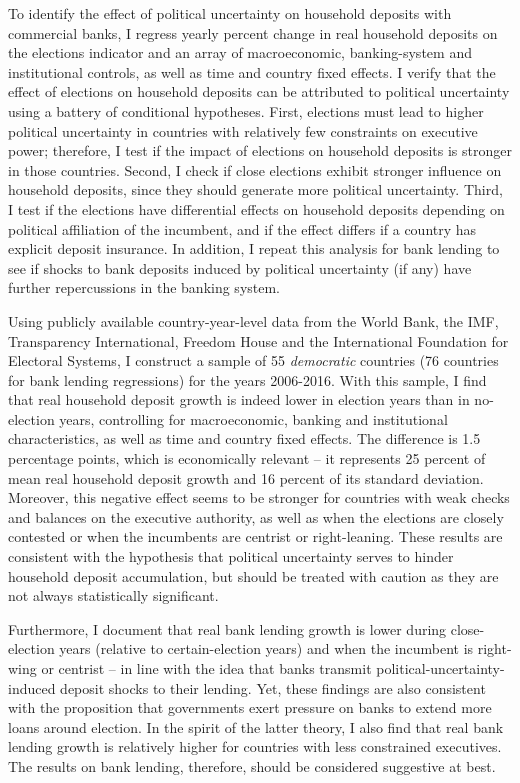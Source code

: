 \documentclass[12pt,a4paper]{article}
\begin{document}
To identify the effect of political uncertainty on household deposits with commercial banks, I regress yearly percent change in real household deposits on the elections indicator and an array of macroeconomic, banking-system and institutional controls, as well as time and country fixed effects. I verify that the effect of elections on household deposits can be attributed to political uncertainty using a battery of conditional hypotheses. First, elections must lead to higher political uncertainty in countries with relatively few constraints on executive power; therefore, I test if the impact of elections on household deposits is stronger in those countries. Second, I check if close elections exhibit stronger influence on household deposits, since they should generate more political uncertainty. Third, I test if the elections have differential effects on household deposits depending on political affiliation of the incumbent, and if the effect differs if a country has explicit deposit insurance. In addition, I repeat this analysis for bank lending to see if shocks to bank deposits induced by political uncertainty (if any) have further repercussions in the banking system.

Using publicly available country-year-level data from the World Bank, the IMF, Transparency International, Freedom House and the International Foundation for Electoral Systems, I construct a sample of 55 \emph{democratic} countries (76 countries for bank lending regressions) for the years 2006-2016. With this sample, I find that real household deposit growth is indeed lower in election years than in no-election years, controlling for macroeconomic, banking and institutional characteristics, as well as time and country fixed effects. The difference is 1.5 percentage points, which is economically relevant -- it represents 25 percent of mean real household deposit growth and 16 percent of its standard deviation. Moreover, this negative effect seems to be stronger for countries with weak checks and balances on the executive authority, as well as when the elections are closely contested or when the incumbents are centrist or right-leaning. These results are consistent with the hypothesis that political uncertainty serves to hinder household deposit accumulation, but should be treated with caution as they are not always statistically significant.

Furthermore, I document that real bank lending growth is lower during close-election years (relative to certain-election years) and when the incumbent is right-wing or centrist -- in line with the idea that banks transmit political-uncertainty-induced deposit shocks to their lending. Yet, these findings are also consistent with the proposition that governments exert pressure on banks to extend more loans around election. In the spirit of the latter theory, I also find that real bank lending growth is relatively higher for countries with less constrained executives. The results on bank lending, therefore, should be considered suggestive at best.
\end{document}
